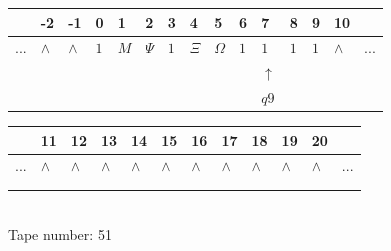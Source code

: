 \documentclass[11pt]{article}
\begin{document}
\begin{table}[H]
\centering
\begin{tabular}{lllllllllllllll}
 & -2 & -1 & 0 & 1 & 2 & 3 & 4 & 5 & 6 & 7 & 8 & 9 & 10 & \\
\hline
$...$ & \multicolumn{1}{|l|}{$\wedge$} & \multicolumn{1}{|l|}{$\wedge$} & \multicolumn{1}{|l|}{$1$} & \multicolumn{1}{|l|}{$M$} & \multicolumn{1}{|l|}{$\Psi$} & \multicolumn{1}{|l|}{$1$} & \multicolumn{1}{|l|}{$\Xi$} & \multicolumn{1}{|l|}{$\Omega$} & \multicolumn{1}{|l|}{$1$} & \multicolumn{1}{|l|}{$1$} & \multicolumn{1}{|l|}{$1$} & \multicolumn{1}{|l|}{$1$} & \multicolumn{1}{|l|}{$\wedge$} & $...$\\
\hline
&  &  &  &  &  &  &  &  &  & $\uparrow$ &  &  &  &  \\
&  &  &  &  &  &  &  &  &  & $ q9 $ &  &  &  &  \\
\end{tabular}
\begin{tabular}{llllllllllll}
 & 11 & 12 & 13 & 14 & 15 & 16 & 17 & 18 & 19 & 20 & \\
\hline
$...$ & \multicolumn{1}{|l|}{$\wedge$} & \multicolumn{1}{|l|}{$\wedge$} & \multicolumn{1}{|l|}{$\wedge$} & \multicolumn{1}{|l|}{$\wedge$} & \multicolumn{1}{|l|}{$\wedge$} & \multicolumn{1}{|l|}{$\wedge$} & \multicolumn{1}{|l|}{$\wedge$} & \multicolumn{1}{|l|}{$\wedge$} & \multicolumn{1}{|l|}{$\wedge$} & \multicolumn{1}{|l|}{$\wedge$} & $...$\\
\hline
&  &  &  &  &  &  &  &  &  &  &  \\
&  &  &  &  &  &  &  &  &  &  &  \\
\end{tabular}
\\
Tape number: 51
\noindent\makebox[\linewidth]{\hdashrule{\textwidth}{1pt}{1pt}}\end{table}
\clearpage
\end{document}

